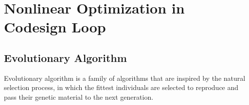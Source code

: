 \chapter{Nonlinear Optimization in Codesign Loop}
\label{chp:05-EvolutionAlgo}

\section{Evolutionary Algorithm}

Evolutionary algorithm is a family of algorithms that are inspired by the natural selection
process, in which the fittest individuals are selected to reproduce and pass their genetic
material to the next generation.